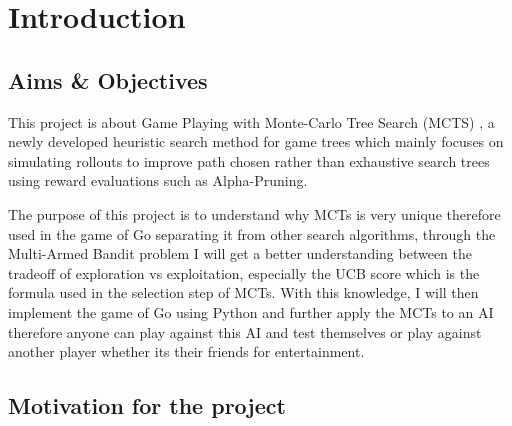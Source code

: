\documentclass[]{final_report}
\begin{document}
\chapter{Introduction}


\section{Aims & Objectives}

This project is about Game Playing with Monte-Carlo Tree Search (MCTS) , a newly developed heuristic search method for game trees which mainly focuses on simulating rollouts to improve path chosen rather than exhaustive search trees using reward evaluations such as Alpha-Pruning. 

The purpose of this project is to understand why MCTs is very unique therefore used in the game of Go separating it from other search algorithms, through the Multi-Armed Bandit problem I will get a better understanding between the tradeoff of exploration vs exploitation, especially the UCB score which is the formula used in the selection step of MCTs. With this knowledge, I will then implement the game of Go using Python and further apply the MCTs to an AI therefore anyone can play against this AI and test themselves or play against another player whether its their friends for entertainment. 

\section{Motivation for the project}
\end{document}
